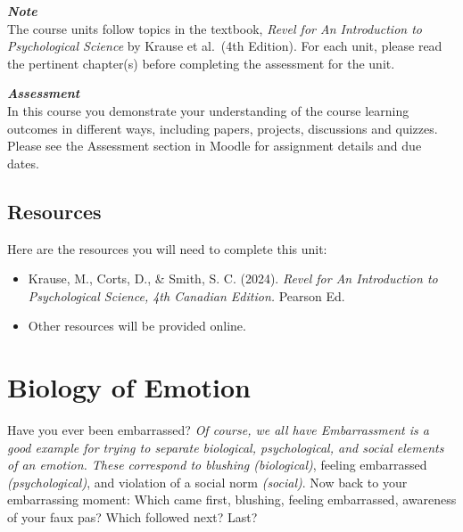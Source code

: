\documentclass[
]{book}
\providecommand{\tightlist}{%
  \setlength{\itemsep}{0pt}\setlength{\parskip}{0pt}}
\begin{document}
\begin{caution}
\textbf{\emph{Note}}\\
The course units follow topics in the textbook, \emph{Revel for An Introduction to Psychological Science} by Krause et al.~(4th Edition). For each unit, please read the pertinent chapter(s) before completing the assessment for the unit.
\end{caution}

\begin{assessment}
\textbf{\emph{Assessment}}\\
In this course you demonstrate your understanding of the course learning outcomes in different ways, including papers, projects, discussions and quizzes. Please see the Assessment section in Moodle for assignment details and due dates.
\end{assessment}

\hypertarget{resources-7}{%
\subsection*{Resources}\label{resources-7}}

Here are the resources you will need to complete this unit:

\begin{itemize}
\tightlist
\item
  Krause, M., Corts, D., \& Smith, S. C. (2024). \emph{Revel for An Introduction to Psychological Science, 4th Canadian Edition.} Pearson Ed.\\
\item
  Other resources will be provided online.
\end{itemize}

\hypertarget{biology-of-emotion}{%
\section{Biology of Emotion}\label{biology-of-emotion}}

Have you ever been embarrassed? \emph{Of course, we all have Embarrassment is a good example for trying to sepa­rate biological, psychological, and social elements of an emotion. These correspond to blushing (biological)}, feeling embarrassed \emph{(psychological)}, and violation of a social norm \emph{(social)}. Now back to your embarrassing moment: Which came first, blushing, feeling embarrassed, awareness of your faux pas? Which followed next? Last?
\end{document}
